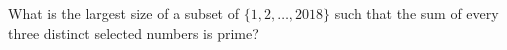 What is the largest size of a subset of $\{1,2,\ldots,2018\}$ such that the sum of every three distinct selected numbers is prime?
